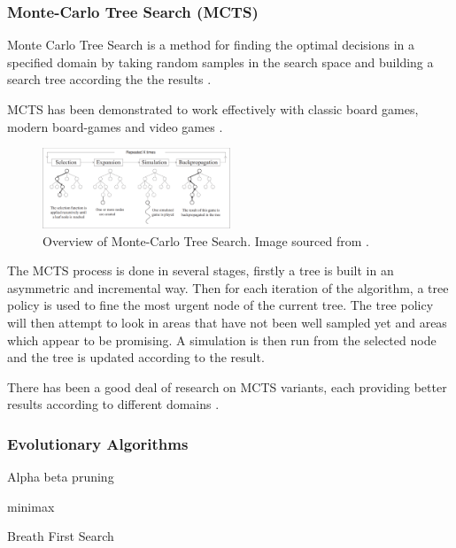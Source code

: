 \documentclass[journal]{IEEEtran}
\begin{document}
		\subsubsection{Monte-Carlo Tree Search (MCTS) }\label{sssec:num1}

		Monte Carlo Tree Search is a method for finding the optimal decisions in a specified domain by taking random samples in the search space and building a search tree according the the results \cite{browne2012survey}. 
		
		MCTS has been demonstrated to work effectively with classic board games, modern board-games and video games \cite{chaslot2008monte}.

		\begin{figure}[h]
		    \centering
		    \includegraphics[width=0.5\textwidth]{MCTSProcess}
		    \caption{Overview of Monte-Carlo Tree Search. Image sourced from \cite{chaslot2008monte}. }
		    \label{fig:MCTS1}
		\end{figure}
		
		The MCTS process is done in several stages, firstly a tree is built in an asymmetric and incremental way. Then for each iteration of the algorithm, a tree policy is used to fine the most urgent node of the current tree. The tree policy will then attempt to look in areas that have not been well sampled yet and areas which appear to be promising. A simulation is then run from the selected node and the tree is updated according to the result.

		

		There has been a good deal of research on MCTS variants, each providing better results according to different domains \cite{browne2012survey, park2015mcts, perez2014knowledge}.
		\subsubsection{Evolutionary Algorithms} \label{sssec:num2}

		
		
		Alpha beta pruning
		
		minimax
		
		Breath First Search
		
\end{document}
